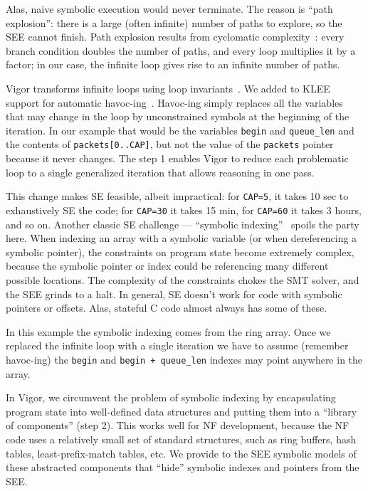 \documentclass[letterpaper,twocolumn,10pt]{article}
\newcommand{\code}[1]{\lstinline{#1}}
\begin{document}
Alas, naive symbolic execution would never terminate. The reason is ``path
explosion'': there is a large (often infinite) number of paths to explore, so
the SEE cannot finish. Path explosion results from cyclomatic
complexity~\cite{mccabe:cyclomatic}: every branch condition doubles the number
of paths, and every loop multiplies it by a factor; in our case, the infinite
loop gives rise to an infinite number of paths.

Vigor transforms infinite loops using loop
invariants~\cite[\S~2.1]{cormen2009introduction}. We added to KLEE support for
automatic havoc-ing~\cite{barnett2005boogie}. Havoc-ing simply replaces all the
variables that may change in the loop by unconstrained symbols at the beginning
of the iteration. In our example that would be the variables \code{begin} and
\code{queue_len} and the contents of \code{packets[0..CAP]}, but not the value
of the \code{packets} pointer because it never changes. The step 1 enables
Vigor to reduce each problematic loop to a single generalized iteration that
allows reasoning in one pass.

This change makes SE feasible, albeit impractical: for \code{CAP=5}, it takes 10
sec to exhaustively SE the code; for \code{CAP=30} it takes 15 min, for
\code{CAP=60} it takes 3 hours, and so on. Another classic SE challenge ---
``symbolic
indexing''~\cite{sen2005cute,godefroid2008automated,boonstoppel2008rwset} spoils
the party here. When
indexing an array with a symbolic variable (or when dereferencing a symbolic
pointer), the constraints on program state become extremely complex, because the
symbolic pointer or index could be referencing many different possible
locations. The complexity of the constraints chokes the SMT solver, and the SEE
grinds to a halt. In general, SE doesn't work for code with symbolic pointers or
offsets. Alas, stateful C code almost always has some of these.

In this example the symbolic indexing comes from the ring array. Once we
replaced the infinite loop with a single iteration we have to assume (remember
havoc-ing) the \code{begin} and \code{begin + queue_len} indexes may point
anywhere in the array.

In Vigor, we circumvent the problem of symbolic indexing by encapsulating program
state into well-defined data structures and putting them into a ``library of
components'' (step 2). This works well for NF development, because the NF code
uses a relatively small set of standard structures, such as ring buffers, hash
tables, least-prefix-match tables, etc. We provide to the SEE symbolic models of
these abstracted components that ``hide'' symbolic indexes and pointers from the
SEE.
\end{document}
